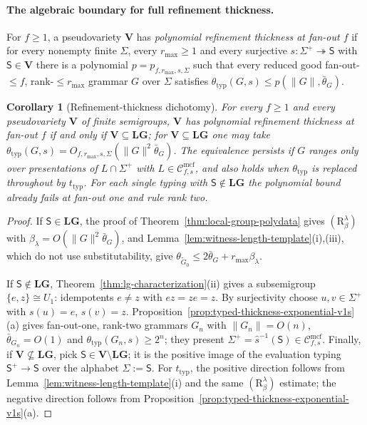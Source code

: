 \documentclass[11pt]{article}
\numberwithin{equation}{section}
\theoremstyle{plain}
\newtheorem{corollary}[theorem]{Corollary}
\theoremstyle{definition}
\theoremstyle{remark}
\newcommand{\Cmcf}[2]{\mathcal{C}^{\mathrm{mcf}}_{#1,#2}}
\theoremstyle{plain}
\begin{document}
\paragraph{The algebraic boundary for full refinement thickness.}
For $f\ge1$, a
pseudovariety $\mathbf V$ has \emph{polynomial refinement thickness at fan-out
$f$} if for every nonempty finite $\Sigma$, every $r_{\max}\ge1$ and every
surjective $s:\Sigma^+\twoheadrightarrow\mathsf S$ with $\mathsf S\in\mathbf V$ there
is a polynomial $p=p_{f,r_{\max},s,\Sigma}$ such that every reduced good
fan-out-$\le f$, rank-$\le r_{\max}$ grammar $G$ over $\Sigma$ satisfies
$\theta_{\mathrm{typ}}(G,s)\le p(\|G\|,\bar\theta_G)$.

\begin{corollary}[Refinement-thickness dichotomy]
\label{cor:refinement-dichotomy}
For every $f\ge1$ and every pseudovariety $\mathbf V$ of finite semigroups,
$\mathbf V$ has polynomial refinement thickness at fan-out $f$ if and only if
$\mathbf V\subseteq\mathbf{LG}$; for $\mathbf V\subseteq\mathbf{LG}$ one may take
$\theta_{\mathrm{typ}}(G,s)=O_{f,r_{\max},s,\Sigma}(\|G\|^2\bar\theta_G)$.  The
equivalence persists if $G$ ranges only over presentations of $L\cap\Sigma^+$
with $L\in\Cmcf{f}{s}$, and also holds when $\theta_{\mathrm{typ}}$ is
replaced throughout by $t_{\mathrm{typ}}$.
For each single typing with $\mathsf S\notin\mathbf{LG}$
the polynomial bound already fails at fan-out one and rule rank two.
\end{corollary}

\begin{proof}
If $\mathsf S\in\mathbf{LG}$, the proof of Theorem~\ref{thm:local-group-polydata}
gives $(\mathrm R_\beta^\lambda)$ with $\beta_\lambda=O(\|G\|^2\bar\theta_G)$, and
Lemma~\ref{lem:witness-length-template}(i),(iii), which do not use
substitutability, give
$\theta_{\widetilde G_0}\le2\bar\theta_G+r_{\max}\beta_\lambda$.

If $\mathsf S\notin\mathbf{LG}$, Theorem~\ref{thm:lg-characterization}(ii) gives a
subsemigroup $\{e,z\}\cong U_1$: idempotents $e\ne z$ with $ez=ze=z$.  By
surjectivity choose $u,v\in\Sigma^+$ with $s(u)=e$, $s(v)=z$.
Proposition~\ref{prop:typed-thickness-exponential-v1s}(a) gives fan-out-one, rank-two
grammars $G_n$ with $\|G_n\|=O(n)$, $\bar\theta_{G_n}=O(1)$ and
$\theta_{\mathrm{typ}}(G_n,s)\ge2^n$; they present
$\Sigma^+=\widehat s^{-1}(\mathsf S)\in\Cmcf{f}{s}$.  Finally, if
$\mathbf V\not\subseteq\mathbf{LG}$, pick $\mathsf S\in\mathbf V\setminus\mathbf{LG}$;
it is the positive image of the evaluation typing $\mathsf S^+\to\mathsf S$ over the
alphabet $\Sigma:=\mathsf S$.  For $t_{\mathrm{typ}}$, the positive
direction follows from Lemma~\ref{lem:witness-length-template}(i) and
the same $(\mathrm R_{\beta}^{\lambda})$ estimate; the negative
direction follows from
Proposition~\ref{prop:typed-thickness-exponential-v1s}(a).
\end{proof}
\end{document}
